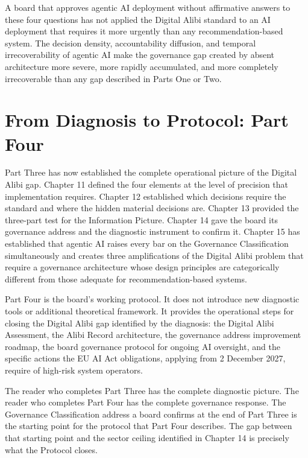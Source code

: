 A board that approves agentic AI deployment without affirmative answers to these four questions has not applied the Digital Alibi standard to an AI deployment that requires it more urgently than any recommendation-based system. The decision density, accountability diffusion, and temporal irrecoverability of agentic AI make the governance gap created by absent architecture more severe, more rapidly accumulated, and more completely irrecoverable than any gap described in Parts One or Two.

\scenebreak

\section{From Diagnosis to Protocol: Part Four}

Part Three has now established the complete operational picture of the Digital Alibi gap. Chapter 11 defined the four elements at the level of precision that implementation requires. Chapter 12 established which decisions require the standard and where the hidden material decisions are. Chapter 13 provided the three-part test for the Information Picture. Chapter 14 gave the board its governance address and the diagnostic instrument to confirm it. Chapter 15 has established that agentic AI raises every bar on the Governance Classification simultaneously and creates three amplifications of the Digital Alibi problem that require a governance architecture whose design principles are categorically different from those adequate for recommendation-based systems.

Part Four is the board's working protocol. It does not introduce new diagnostic tools or additional theoretical framework. It provides the operational steps for closing the Digital Alibi gap identified by the diagnosis: the Digital Alibi Assessment, the Alibi Record architecture, the governance address improvement roadmap, the board governance protocol for ongoing AI oversight, and the specific actions the EU AI Act obligations, applying from 2 December 2027, require of high-risk system operators.

The reader who completes Part Three has the complete diagnostic picture. The reader who completes Part Four has the complete governance response. The Governance Classification address a board confirms at the end of Part Three is the starting point for the protocol that Part Four describes. The gap between that starting point and the sector ceiling identified in Chapter 14 is precisely what the Protocol closes.
